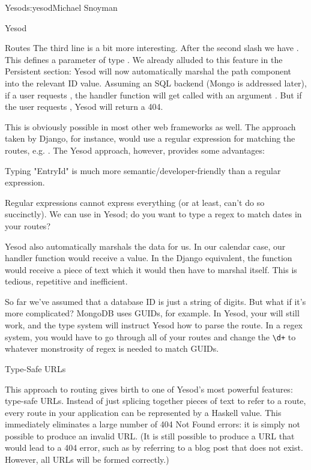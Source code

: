 \begin{aosachapter}{Yesod}{s:yesod}{Michael Snoyman}
\begin{aosasect1}{Yesod}
\begin{aosasect2}{Routes}
The third line is a bit more interesting. After the second slash we
have . This defines a parameter of type
. We already alluded to this
feature in the Persistent section: Yesod will now automatically marshal the path component into
the relevant ID value. Assuming an SQL backend (Mongo is addressed
later), if a user requests , the handler function will
get called with an argument . But if the user requests
, Yesod will return a 404.

This is obviously possible in most other web frameworks as well. The
approach taken by Django, for instance, would use a regular expression
for matching the routes, e.g. . The Yesod
approach, however, provides some advantages:

\begin{aosaitemize}

\item Typing "EntryId" is much more semantic/developer-friendly than a
  regular expression.

\item Regular expressions cannot express everything (or at least,
  can't do so succinctly). We can use  in Yesod;
  do you want to type a regex to match dates in your routes?

\item Yesod also automatically marshals the data for us. In our
  calendar case, our handler function would receive a 
  value. In the Django equivalent, the function would receive a piece
  of text which it would then have to marshal itself. This is tedious,
  repetitive and inefficient.

\item So far we've assumed that a database ID is just a string of
  digits. But what if it's more complicated? MongoDB uses GUIDs, for
  example. In Yesod, your  will still work, and the type
  system will instruct Yesod how to parse the route. In a regex
  system, you would have to go through all of your routes and change
  the \verb=\d+= to whatever monstrosity of regex is needed to match GUIDs.

\end{aosaitemize}

\begin{aosasect3}{Type-Safe URLs}

This approach to routing gives birth to one of Yesod's most powerful
features: type-safe URLs. Instead of just splicing together pieces of
text to refer to a route, every route in your application can be
represented by a Haskell value. This immediately eliminates a large
number of 404 Not Found errors: it is simply not possible to produce
an invalid URL.  (It is still possible to produce a URL that would lead to a 404 error, such as
by referring to a blog post that does not exist. However, all URLs
will be formed correctly.)


\end{aosasect3}
\end{aosasect2}
\end{aosasect1}
\end{aosachapter}
